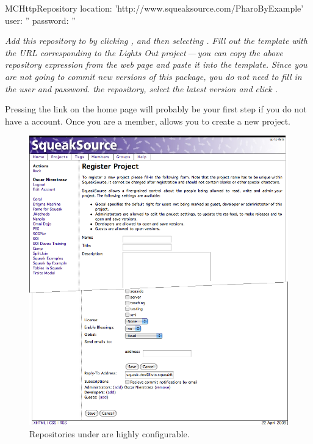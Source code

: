 \documentclass[a4paper,10pt,twoside]{book}
\begin{document}

\begin{code}{}
MCHttpRepository
    location: 'http://www.squeaksource.com/PharoByExample'
    user: ''
    password: ''
\end{code}
\noindent
\emph{Add this repository to \MC by clicking , and then selecting . Fill out the template with the URL corresponding to the Lights Out project\,---\,you can copy the above repository expression from the web page and paste it into the template.
Since you are not going to commit new versions of this package, you do not need to fill in the user and password.
 the repository, select the latest version and click .}

Pressing the  link on the \sqsrc home page will probably be your first step if you do not have a \sqsrc account. 
Once you are a member,  allows you to create a new project. 


\begin{figure}[ht]\centering
	\includegraphics[width=\textwidth]{squeaksourcesetting}
	\caption{Repositories under \sqsrc are highly configurable.}
\end{figure}
\end{document}
